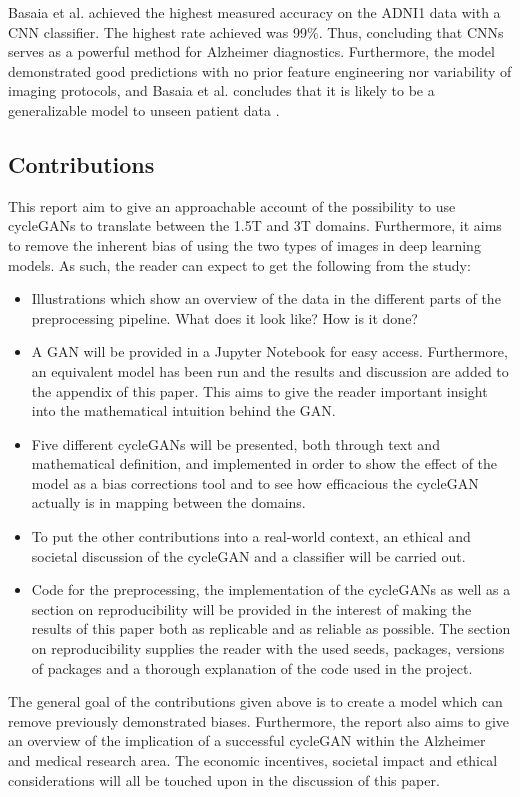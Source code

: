 \documentclass[12pt, fleqn, titlepage]{article}
\begin{document}
Basaia et al. achieved the highest measured accuracy on the ADNI1 data with a CNN classifier. The highest rate achieved was 99\%. Thus, concluding that CNNs serves as a powerful method for Alzheimer diagnostics. Furthermore, the model demonstrated good predictions with no prior feature engineering nor variability of imaging protocols, and Basaia et al. concludes that it is likely to be a generalizable model to unseen patient data \cite{neuro}. 

\subsection{Contributions}

This report aim to give an approachable account of the possibility to use cycleGANs to translate between the 1.5T and 3T domains. Furthermore, it aims to remove the inherent bias of using the two types of images in deep learning models. As such, the reader can expect to get the following from the study:

\begin{itemize}
	\item Illustrations which show an overview of the data in the different parts of the preprocessing pipeline. What does it look like? How is it done?
	
	\item A GAN will be provided in a Jupyter Notebook for easy access. Furthermore, an equivalent model has been run and the results and discussion are added to the appendix of this paper. This aims to give the reader important insight into the mathematical intuition behind the GAN.
	
	\item Five different cycleGANs will be presented, both through text and mathematical definition, and implemented in order to show the effect of the model as a bias corrections tool and to see how efficacious the cycleGAN actually is in mapping between the domains.
	
	\item To put the other contributions into a real-world context, an ethical and societal discussion of the cycleGAN and a classifier will be carried out. 
	
	\item Code for the preprocessing, the implementation of the cycleGANs as well as a section on reproducibility will be provided in the interest of making the results of this paper both as replicable and as reliable as possible. The section on reproducibility supplies the reader with the used seeds, packages, versions of packages and a thorough explanation of the code used in the project.
\end{itemize}
\noindent
The general goal of the contributions given above is to create a model which can remove previously demonstrated biases. Furthermore, the report also aims to give an overview of the implication of a successful cycleGAN within the Alzheimer and medical research area. The economic incentives, societal impact and ethical considerations will all be touched upon in the discussion of this paper. 
\end{document}
